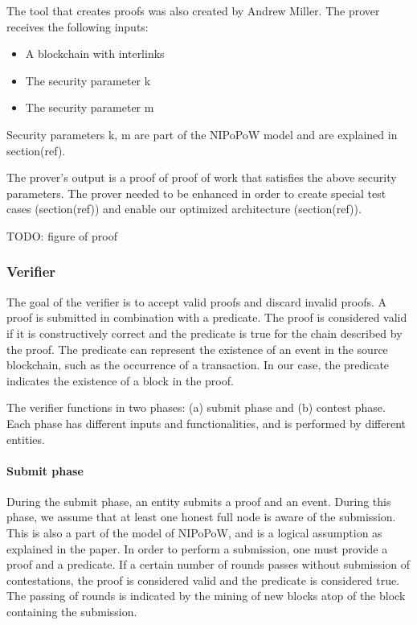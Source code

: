 The tool that creates proofs was also created by Andrew Miller. The
prover receives the following inputs:

\begin{itemize}
    \item
        A blockchain with interlinks
    \item
        The security parameter k
    \item
        The security parameter m
\end{itemize}

Security parameters k, m are part of the NIPoPoW model and are
explained in section(ref).

The prover’s output is a proof of proof of work that satisfies the
above security parameters. The prover needed to be enhanced in order
to create special test cases (section(ref)) and enable our optimized
architecture (section(ref)).

TODO: figure of proof

\subsubsection{Verifier}

The goal of the verifier is to accept valid proofs and discard invalid
proofs. A proof is submitted in combination with a predicate. The
proof is considered valid if it is constructively correct and the
predicate is true for the chain described by the proof. The predicate
can represent the existence of an event in the source blockchain, such
as the occurrence of a transaction. In our case, the predicate
indicates the existence of a block in the proof.

The verifier functions in two phases: (a) submit phase and (b) contest
phase. Each phase has different inputs and functionalities, and is
performed by different entities.

\paragraph{Submit phase} During the submit phase, an entity submits a
proof and an event. During this phase, we assume that at least one
honest full node is aware of the submission. This is also a part of
the model of NIPoPoW, and is a logical assumption as explained in the
paper. In order to perform a submission, one must provide a proof and
a predicate. If a certain number of rounds passes without submission
of contestations, the proof is considered valid and the predicate is
considered true. The passing of rounds is indicated by the mining of
new blocks atop of the block containing the submission.


